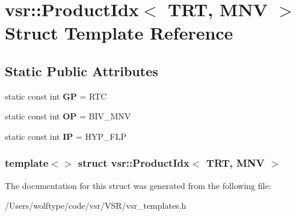 \hypertarget{structvsr_1_1_product_idx_3_01_t_r_t_00_01_m_n_v_01_4}{\section{vsr\-:\-:Product\-Idx$<$ T\-R\-T, M\-N\-V $>$ Struct Template Reference}
\label{structvsr_1_1_product_idx_3_01_t_r_t_00_01_m_n_v_01_4}
}
\subsection*{Static Public Attributes}
\begin{DoxyCompactItemize}
\item 
\hypertarget{structvsr_1_1_product_idx_3_01_t_r_t_00_01_m_n_v_01_4_aea63bf319e617402f714c62f4e17527e}{static const int {\bfseries G\-P} = R\-T\-C}\label{structvsr_1_1_product_idx_3_01_t_r_t_00_01_m_n_v_01_4_aea63bf319e617402f714c62f4e17527e}

\item 
\hypertarget{structvsr_1_1_product_idx_3_01_t_r_t_00_01_m_n_v_01_4_acbbb06f9b44b88280d2a481333554da7}{static const int {\bfseries O\-P} = B\-I\-V\-\_\-\-M\-N\-V}\label{structvsr_1_1_product_idx_3_01_t_r_t_00_01_m_n_v_01_4_acbbb06f9b44b88280d2a481333554da7}

\item 
\hypertarget{structvsr_1_1_product_idx_3_01_t_r_t_00_01_m_n_v_01_4_a3fc00ba0abf6d5c25afb69f6f867f188}{static const int {\bfseries I\-P} = H\-Y\-P\-\_\-\-F\-L\-P}\label{structvsr_1_1_product_idx_3_01_t_r_t_00_01_m_n_v_01_4_a3fc00ba0abf6d5c25afb69f6f867f188}

\end{DoxyCompactItemize}
\subsubsection*{template$<$$>$ struct vsr\-::\-Product\-Idx$<$ T\-R\-T, M\-N\-V $>$}



The documentation for this struct was generated from the following file\-:\begin{DoxyCompactItemize}
\item 
/\-Users/wolftype/code/vsr/\-V\-S\-R/vsr\-\_\-templates.\-h\end{DoxyCompactItemize}
